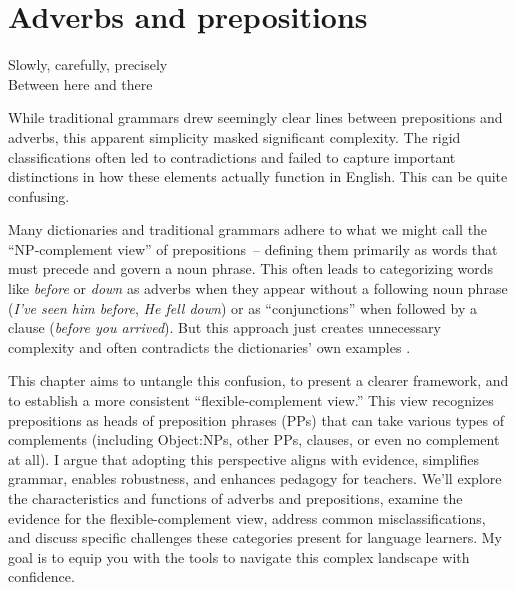 \chapter{Adverbs and prepositions}

\epigraph{Slowly, carefully, precisely\\Between here and there}{}

\noindent
While traditional grammars drew seemingly clear lines between prepositions and adverbs, this apparent simplicity masked significant complexity. The rigid classifications often led to contradictions and failed to capture important distinctions in how these elements actually function in English. This can be quite confusing.

Many dictionaries and traditional grammars adhere to what we might call the ``NP-complement view'' of prepositions~-- defining them primarily as words that must precede and govern a noun phrase. This often leads to categorizing words like \textit{before} or \textit{down} as adverbs when they appear without a following noun phrase (\textit{I've seen him before}, \textit{He fell down}) or as ``conjunctions'' when followed by a clause (\textit{before you arrived}). But this approach just creates unnecessary complexity and often contradicts the dictionaries' own examples \autocite{reynolds2025}.

This chapter aims to untangle this confusion, to present a clearer framework, and to establish a more consistent ``flexible-complement view.'' This view recognizes prepositions as heads of preposition phrases (PPs) that can take various types of complements (including Object:NPs, other PPs, clauses, or even no complement at all).  I argue that adopting this perspective aligns with evidence, simplifies grammar, enables robustness, and enhances pedagogy for teachers. We'll explore the characteristics and functions of adverbs and prepositions, examine the evidence for the flexible-complement view, address common misclassifications, and discuss specific challenges these categories present for language learners. My goal is to equip you with the tools to navigate this complex landscape with confidence.

